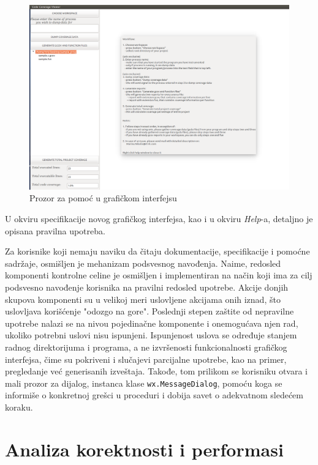 \documentclass[12pt,oneside]{memoir}
\newcommand{\kod}[1]{\texttt{#1}}
\newcommand{\strano}[1]{\textit{#1}}
\begin{document}
\begin{figure}[!ht]
  \centering
  \includegraphics[width=\textwidth]{img/GUI_4.png}
  \caption{Prozor za pomoć u grafičkom interfejsu}
  \label{fig:GUI4}
\end{figure}
 
U okviru specifikacije novog grafičkog interfejsa, kao i u okviru \strano{Help}-a, detaljno je opisana pravilna upotreba. 

Za korisnike koji nemaju naviku da čitaju dokumentacije, specifikacije i pomoćne sadržaje, osmišljen je mehanizam podsvesnog navođenja. Naime, redosled komponenti kontrolne celine je osmišljen i implementiran na način koji ima za cilj podsvesno navođenje korisnika na pravilni redosled upotrebe. Akcije donjih skupova komponenti su u velikoj meri uslovljene akcijama onih iznad, što uslovljava korišćenje "odozgo na gore". Poslednji stepen zaštite od nepravilne upotrebe nalazi se na nivou pojedinačne komponente i onemogućava njen rad, ukoliko potrebni uslovi nisu ispunjeni. Ispunjenost uslova se određuje stanjem radnog direktorijuma i programa, a ne izvršenosti funkcionalnosti grafičkog interfejsa, čime su pokriveni i slučajevi parcijalne upotrebe, kao na primer, pregledanje već generisanih izveštaja. Takođe, tom prilikom se korisniku otvara i mali prozor za dijalog, instanca klase \kod{wx.MessageDialog}, pomoću koga se informiše o konkretnoj grešci u proceduri i dobija savet o adekvatnom sledećem koraku.


\chapter{Analiza korektnosti i performasi}
\label{chp:testiranje}
\end{document}
